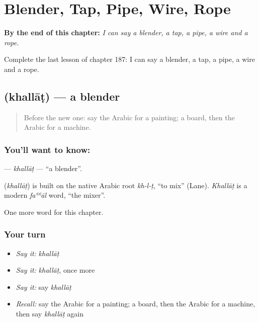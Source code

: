 
\chapter{Blender, Tap, Pipe, Wire, Rope}
\label{ch:ar-blender-tap-pipe-wire-rope}

\begin{chapteropening}
\textbf{By the end of this chapter:} \emph{I can say a blender, a tap, a pipe, a wire and a rope.}

Complete the last lesson of chapter 187: I can say a blender, a tap, a pipe, a wire and a rope.
\end{chapteropening}

\section[\texorpdfstring{\ar{خلاط} (khallāṭ)}{خلاط (khallāṭ)}]{ (khallāṭ) — a blender}

\label{lesson:AR-C187-khallat}



\begin{quote}
Before the new one: say the Arabic for a painting; a board, then the Arabic for a machine.
\end{quote}

\subsection*{You'll want to know: }
\textbf{} — \emph{khallāṭ} — \textquotedblleft{}a blender\textquotedblright{}.

\begin{cousinweb}
\textbf{} (\emph{khallāṭ}) is built on the native Arabic root \emph{kh-l-ṭ}, \textquotedblleft{}to mix\textquotedblright{} (Lane). \emph{Khallāṭ} is a modern \emph{faʿʿāl} word, \textquotedblleft{}the mixer\textquotedblright{}.
\end{cousinweb}

\begin{grammarlens}[title={What you've built}]
One more word for this chapter.
\end{grammarlens}

\subsection*{Your turn}
\begin{itemize}
\raggedright
  \item \emph{Say it:} \emph{khallāṭ}
  \item \emph{Say it:} \emph{khallāṭ}, once more
  \item \emph{Say it:} say \emph{khallāṭ}
  \item \emph{Recall:} say the Arabic for a painting; a board, then the Arabic for a machine, then say \emph{khallāṭ} again
\end{itemize}


